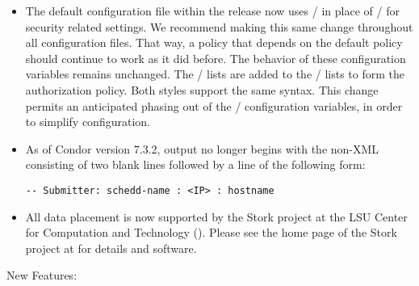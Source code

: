 \begin{itemize}

\item The default configuration file within the release now uses
  / in place of
  / for security related settings.
  We recommend making this
  same change throughout all configuration files.  That way,
  a policy that depends on the default policy should continue to
  work as it did before.  The behavior of these configuration variables
  remains unchanged.  The / lists are
  added to the / lists to form the
  authorization policy.  Both styles support the same syntax.  
  This change permits an anticipated
  phasing out of the /  configuration
  variables, in order to simplify configuration.

\item As of Condor version 7.3.2,   output no longer 
  begins with the non-XML consisting of two blank lines followed by a line
  of the following form:

\begin{verbatim}
-- Submitter: schedd-name : <IP> : hostname
\end{verbatim}

\item All  data placement is now supported by the Stork
project at the 
LSU Center for Computation and Technology
().
Please see the home page of the Stork project at
 for details and
software.

\end{itemize}


\noindent New Features:

